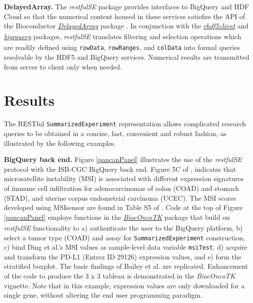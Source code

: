 \documentclass[applications]{gen-bioinformatics}
\newcommand{\BiocpackageFirst}[1]{{\emph{\href{https://bioconductor.org/packages/3.8/#1}{#1\textsubscript{\faExternalLink}}}}}
\newcommand{\Biocpackage}[1]{{\textit{#1}}}
\newcommand{\CRANpackageFirst}[1]{{\emph{\href{https://cran.r-project.org/web/packages/#1/index.html}{#1\textsubscript{\faExternalLink}}}}}
\begin{document}
\noindent
\textbf{DelayedArray.}
The \Biocpackage{restfulSE} package provides interfaces to 
BigQuery and HDF Cloud so that 
the numerical content housed in these services
satisfies the API of the Bioconductor \BiocpackageFirst{DelayedArray} package \citep{Pages2018}.  
In conjunction with the \BiocpackageFirst{rhdf5client} \citep{rclient} and \CRANpackageFirst{bigrquery} \citep{bigr} packages,
\Biocpackage{restfulSE} translates filtering and selection operations
which are readily defined using \verb+rowData+, \verb+rowRanges+,
and \verb+colData+ into formal queries resolvable by the HDF5 and
BigQuery services.  Numerical results are transmitted from
server to client only when needed.

\section*{Results}

The RESTful \texttt{SummarizedExperiment} representation
allows complicated research queries to be obtained in a concise,
fast, convenient and robust fashion, as illustrated by
the following examples.

\textbf{BigQuery back end.} Figure \ref{pancanPanel} illustrates the 
use of the \Biocpackage{restfulSE} protocol
with the ISB-CGC BigQuery back end.  Figure 5C
of \citet{Bailey2018}, indicates that
microsatellite instability (MSI) is associated with
different expression signatures of immune cell infiltration
for adenocarcinomas of colon (COAD) and stomach (STAD), and
uterine corpus endometrial carcinoma (UCEC).  
The MSI scores developed using MSIsensor are found
in Table S5 of \cite{Ding2018}.
Code at the top of Figure \ref{pancanPanel} employs
functions in the \BiocpackageFirst{BiocOncoTK} \citep{bionc} package that build on
\Biocpackage{restfulSE} functionality to a) authenticate the
user to the BigQuery platform, b) select a tumor
type (COAD) and assay for \texttt{SummarizedExperiment}
construction, c) bind Ding et al.'s MSI values as
sample-level data variable \verb+msiTest+, d)
acquire and transform the PD-L1 
(Entrez ID 29126)
expression values, and e) form the stratified boxplot. 
The basic findings of Bailey et al. are replicated.
Enhancement of the code to produce the 3 x 3 tableau
is demonstrated in the \Biocpackage{BiocOncoTK} \citep{bionc} vignette.
Note that in this example, expression values are
only downloaded for a single gene, without altering
the end user programming paradigm.
\end{document}
